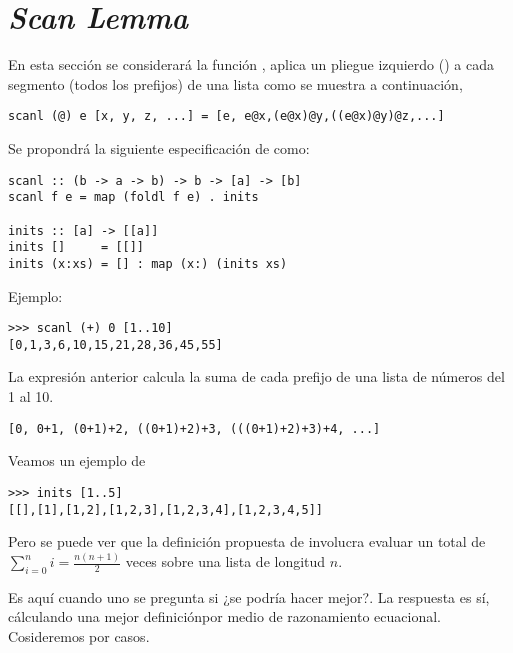 
\section{\textit{Scan Lemma}}

En esta sección se considerará la función ,  aplica un pliegue
izquierdo () a cada segmento (todos los prefijos) de una lista como se muestra
a continuación,

\begin{verbatim}
scanl (@) e [x, y, z, ...] = [e, e@x,(e@x)@y,((e@x)@y)@z,...]
\end{verbatim}

Se propondrá la siguiente especificación de  como:
\begin{verbatim}
scanl :: (b -> a -> b) -> b -> [a] -> [b]
scanl f e = map (foldl f e) . inits

inits :: [a] -> [[a]]
inits []     = [[]]
inits (x:xs) = [] : map (x:) (inits xs)
\end{verbatim}

Ejemplo:
\begin{verbatim}
>>> scanl (+) 0 [1..10]
[0,1,3,6,10,15,21,28,36,45,55]
\end{verbatim}

La expresión anterior calcula la suma de cada prefijo de una lista de números del 1 al 10.
\begin{verbatim}
[0, 0+1, (0+1)+2, ((0+1)+2)+3, (((0+1)+2)+3)+4, ...]
\end{verbatim}

Veamos un ejemplo de 
\begin{verbatim}
>>> inits [1..5]
[[],[1],[1,2],[1,2,3],[1,2,3,4],[1,2,3,4,5]]
\end{verbatim}

Pero se puede ver que la definición propuesta de  involucra evaluar  un
total de $\sum_{i=0}^{n} i = \frac{n(n+1)}{2}$ veces sobre una lista de longitud $n$.

Es aquí cuando uno se pregunta si ¿se podría hacer mejor?. La respuesta es sí, cálculando una mejor
definiciónpor medio de razonamiento ecuacional. Cosideremos por casos.

